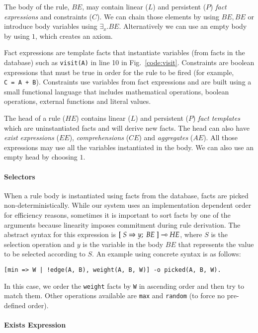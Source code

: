 The body of the rule, $BE$, may contain linear ($L$) and persistent ($P$) \emph{fact expressions} and
constraints ($C$). We can chain those elements by using $BE, BE$ or introduce body variables using $\exists_{x}. BE$.
Alternatively we can use an empty body by using $1$, which creates an axiom.

Fact expressions are template facts that instantiate variables
(from facts in the database) such as \texttt{visit(A)} in line 10 in Fig.~\ref{code:visit}.
Constraints are boolean expressions that must
be true in order for the rule to be fired (for example, \texttt{C~=~A~+~B}). Constraints use variables from fact expressions and are built using a small functional language that includes mathematical operations, boolean operations, external functions and literal values.

The head of a rule ($HE$) contains linear ($L$) and persistent ($P$) \emph{fact templates} which are uninstantiated facts and will derive new facts. The head can also have \emph{exist expressions} ($EE$), \emph{comprehensions} ($CE$) and \emph{aggregates} ($AE$). All those expressions
may use all the variables instantiated in the body. We can also use an empty head by choosing $1$.

\paragraph{Selectors}

When a rule body is instantiated using facts from the database, facts are picked
non-deterministically. While our system uses an implementation dependent order for
efficiency reasons, sometimes it is important to sort facts by one of the arguments
because linearity imposes commitment during rule derivation. The abstract syntax for
this expression is $[\; S \Rightarrow y; \; BE \;] \multimap HE$, where $S$ is the selection operation and $y$ is the
variable in the body $BE$ that represents the value to be selected according to $S$.
An example using concrete syntax is as follows:

{\small
\begin{Verbatim}
[min => W | !edge(A, B), weight(A, B, W)] -o picked(A, B, W).
\end{Verbatim}
}

In this case, we order the \texttt{weight} facts by \texttt{W} in ascending order and then try
to match them. Other operations available are \texttt{max} and \texttt{random} (to force no pre-defined order).

\paragraph{Exists Expression}


